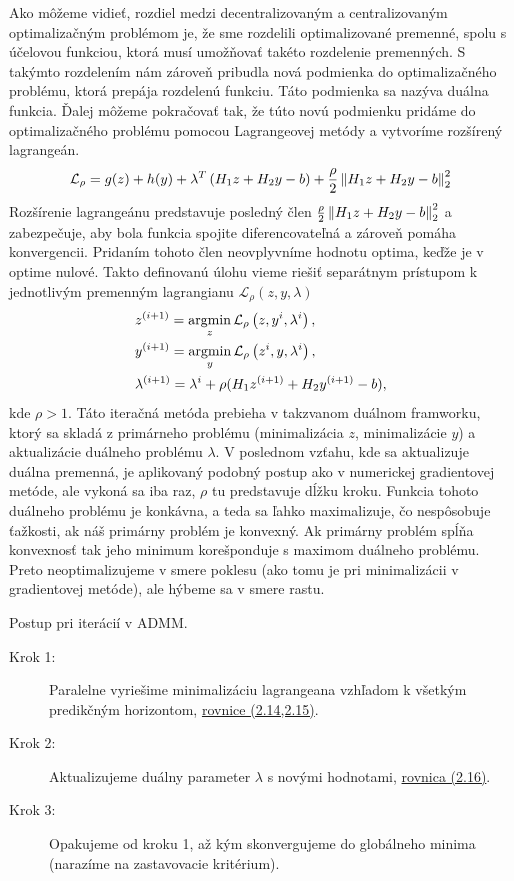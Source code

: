 Ako môžeme vidieť, rozdiel medzi decentralizovaným a centralizovaným optimalizačným problémom je, že sme rozdelili optimalizované premenné, spolu s účelovou funkciou, ktorá musí umožňovať takéto rozdelenie premenných. S takýmto rozdelením nám zároveň pribudla nová podmienka do optimalizačného problému, ktorá prepája rozdelenú funkciu. Táto podmienka sa nazýva duálna funkcia. 
Ďalej môžeme pokračovať tak, že túto novú podmienku pridáme do optimalizačného problému pomocou Lagrangeovej metódy a vytvoríme rozšírený lagrangeán.
\begin{equation}
	\mathcal{L}_{\rho} = g(z) + h(y) + \lambda^{T}\left(  H_{1}z + H_{2}y - b \right) + \frac{\rho}{2} \left\lVert H_{1}z + H_{2}y - b\right\rVert_{2}^{2}
\end{equation}
Rozšírenie lagrangeánu predstavuje posledný člen $\frac{\rho}{2} \left\lVert H_{1}z + H_{2}y - b\right\rVert_{2}^{2}$ a zabezpečuje, aby bola funkcia spojite diferencovateľná a zároveň pomáha konvergencii. Pridaním tohoto člen neovplyvníme hodnotu optima, keďže je v optime nulové. Takto definovanú úlohu vieme riešiť separátnym prístupom k jednotlivým premenným lagrangianu $\mathcal{L}_{\rho} \left(z,y,\lambda \right)$
\label{math:ADMM_iteracie}
\begin{align}
	&z^{(i+1)} = \operatorname*{argmin}_{z} \mathcal{L}_{\rho} \left(z,y^{i},\lambda^{i} \right),\\
	&y^{(i+1)} = \operatorname*{argmin}_{y} \mathcal{L}_{\rho} \left(z^{i},y,\lambda^{i} \right),\\
	&\lambda^{(i+1)} = \lambda^{i} + \rho( H_{1}z^{(i+1)} + H_{2}y^{(i+1)} - b ),
\end{align}
kde $\rho > 1$. Táto iteračná metóda prebieha v takzvanom duálnom framworku, ktorý sa skladá z primárneho problému (minimalizácia $z$, minimalizácie $y$) a aktualizácie duálneho problému $\lambda$. V poslednom vzťahu, kde sa aktualizuje duálna premenná, je aplikovaný podobný postup ako v numerickej gradientovej metóde, ale vykoná sa iba raz, $\rho$ tu predstavuje dĺžku kroku. Funkcia tohoto duálneho problému je konkávna, a teda sa ľahko maximalizuje, čo nespôsobuje ťažkosti, ak náš primárny problém je konvexný. Ak primárny problém spĺňa konvexnosť tak jeho minimum korešponduje s maximom duálneho problému. Preto neoptimalizujeme v smere poklesu (ako tomu je pri minimalizácii v gradientovej metóde), ale hýbeme sa v smere rastu\cite{bib1}. 
\label{subse:ADMM2}

Postup pri iterácií v ADMM.
\begin{description}
	\item[Krok 1:] {Paralelne vyriešime minimalizáciu lagrangeana vzhľadom k všetkým predikčným horizontom, \hyperref[math:ADMM_iteracie]{rovnice (2.14,2.15)}.}
	\item[Krok 2:] {Aktualizujeme duálny parameter $\lambda$ s novými hodnotami, \hyperref[math:ADMM_iteracie]{rovnica (2.16)}.}
	\item[Krok 3:] {Opakujeme od kroku 1, až kým skonvergujeme do globálneho minima (narazíme na zastavovacie kritérium).}
\end{description}

